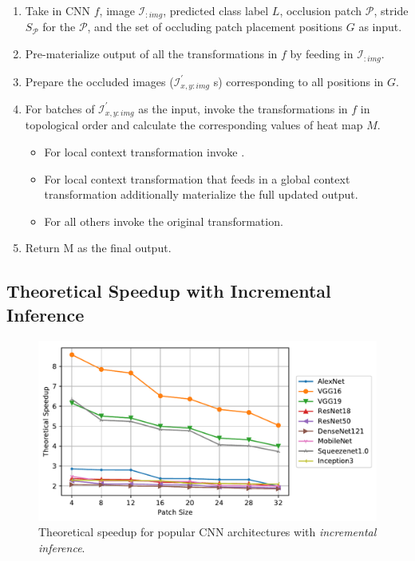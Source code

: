 \begin{enumerate}
	\item Take in CNN $f$, image $\mathcal{I}_{:img}$, predicted class label $L$, occlusion patch $\mathcal{P}$, stride $S_{\mathcal{P}}$ for the $\mathcal{P}$, and the set of occluding patch placement positions $G$ as input.
	\item Pre-materialize output of all the transformations in $f$ by feeding in $\mathcal{I}_{:img}$.
	\item Prepare the occluded images ($\mathcal{I}^{'}_{x,y:img}$ s) corresponding to all positions in $G$.
	\item For batches of $\mathcal{I}^{'}_{x,y:img}$ as the input, invoke the transformations in $f$ in topological order and calculate the corresponding values of heat map $M$.
	\begin{itemize}
		\item For local context transformation invoke .
		\item For local context transformation that feeds in a global context transformation additionally materialize the full updated output.
		\item For all others invoke the original transformation.
	\end{itemize}
	\item Return M as the final output.
\end{enumerate}


\subsection{Theoretical Speedup with Incremental Inference}

\begin{figure}[t]
\includegraphics[width=\columnwidth]{images/redundancy_ratio}
\caption{Theoretical speedup for popular CNN architectures with \textit{incremental inference}.}
\label{fig:redundancy_ratio}
\end{figure}

